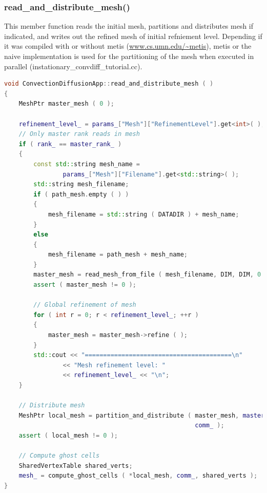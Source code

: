 \documentclass[a4paper, 11pt, twoside]{article}
\begin{document}
\subsubsection{read\_and\_distribute\_mesh()}\label{read-mesh}
This member function reads the initial mesh, partitions and distributes mesh if indicated, and writes out the refined mesh of initial refniement level. Depending if it was compiled with or without metis (\url{www.cs.umn.edu/~metis}), metis or the naive implementation is used for the partitioning of the mesh when executed in parallel (instationary\_convdiff\_tutorial.cc).
\begin{lstlisting}[language=C++, basicstyle={\footnotesize, \ttfamily}, keywordstyle=\color{blue}, numbers=none, tabsize=4]
void ConvectionDiffusionApp::read_and_distribute_mesh ( )
{
    MeshPtr master_mesh ( 0 );

    refinement_level_ = params_["Mesh"]["RefinementLevel"].get<int>( );
    // Only master rank reads in mesh
    if ( rank_ == master_rank_ )
    {
        const std::string mesh_name =
                params_["Mesh"]["Filename"].get<std::string>( );
        std::string mesh_filename;
        if ( path_mesh.empty ( ) )
        {
            mesh_filename = std::string ( DATADIR ) + mesh_name;
        }
        else
        {
            mesh_filename = path_mesh + mesh_name;
        }
        master_mesh = read_mesh_from_file ( mesh_filename, DIM, DIM, 0 );
        assert ( master_mesh != 0 );

        // Global refinement of mesh
        for ( int r = 0; r < refinement_level_; ++r )
        {
            master_mesh = master_mesh->refine ( );
        }
        std::cout << "========================================\n"
                << "Mesh refinement level: "
                << refinement_level_ << "\n";
    }

    // Distribute mesh
    MeshPtr local_mesh = partition_and_distribute ( master_mesh, master_rank_,
    										   	    comm_ );
    assert ( local_mesh != 0 );

    // Compute ghost cells
    SharedVertexTable shared_verts;
    mesh_ = compute_ghost_cells ( *local_mesh, comm_, shared_verts );
}
\end{lstlisting}
\end{document}
